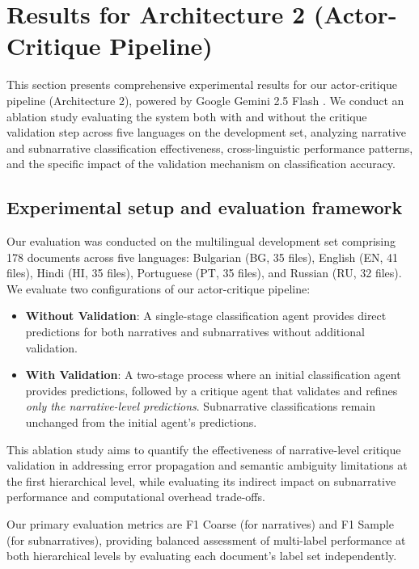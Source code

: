 \section{Results for Architecture 2 (Actor-Critique Pipeline)}
\label{sec:actor-critique-results}

This section presents comprehensive experimental results for our actor-critique pipeline (Architecture 2), powered by Google Gemini 2.5 Flash \cite{google_gemini_2024}. We conduct an ablation study evaluating the system both with and without the critique validation step across five languages on the development set, analyzing narrative and subnarrative classification effectiveness, cross-linguistic performance patterns, and the specific impact of the validation mechanism on classification accuracy.

\subsection{Experimental setup and evaluation framework}

Our evaluation was conducted on the multilingual development set comprising 178 documents across five languages: Bulgarian (BG, 35 files), English (EN, 41 files), Hindi (HI, 35 files), Portuguese (PT, 35 files), and Russian (RU, 32 files). We evaluate two configurations of our actor-critique pipeline:

\begin{itemize}
    \item \textbf{Without Validation}: A single-stage classification agent provides direct predictions for both narratives and subnarratives without additional validation.
    \item \textbf{With Validation}: A two-stage process where an initial classification agent provides predictions, followed by a critique agent that validates and refines \emph{only the narrative-level predictions}. Subnarrative classifications remain unchanged from the initial agent's predictions.
\end{itemize}

This ablation study aims to quantify the effectiveness of narrative-level critique validation in addressing error propagation and semantic ambiguity limitations at the first hierarchical level, while evaluating its indirect impact on subnarrative performance and computational overhead trade-offs.

Our primary evaluation metrics are F1 Coarse (for narratives) and F1 Sample (for subnarratives), providing balanced assessment of multi-label performance at both hierarchical levels by evaluating each document's label set independently.

